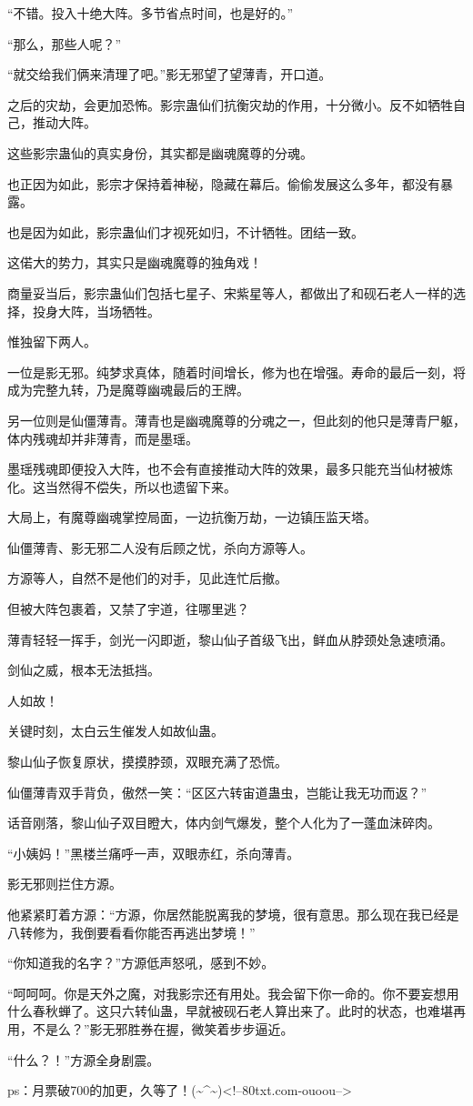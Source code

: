 \begin{this_body}
“不错。投入十绝大阵。多节省点时间，也是好的。”

“那么，那些人呢？”

“就交给我们俩来清理了吧。”影无邪望了望薄青，开口道。

之后的灾劫，会更加恐怖。影宗蛊仙们抗衡灾劫的作用，十分微小。反不如牺牲自己，推动大阵。

这些影宗蛊仙的真实身份，其实都是幽魂魔尊的分魂。

也正因为如此，影宗才保持着神秘，隐藏在幕后。偷偷发展这么多年，都没有暴露。

也是因为如此，影宗蛊仙们才视死如归，不计牺牲。团结一致。

这偌大的势力，其实只是幽魂魔尊的独角戏！

商量妥当后，影宗蛊仙们包括七星子、宋紫星等人，都做出了和砚石老人一样的选择，投身大阵，当场牺牲。

惟独留下两人。

一位是影无邪。纯梦求真体，随着时间增长，修为也在增强。寿命的最后一刻，将成为完整九转，乃是魔尊幽魂最后的王牌。

另一位则是仙僵薄青。薄青也是幽魂魔尊的分魂之一，但此刻的他只是薄青尸躯，体内残魂却并非薄青，而是墨瑶。

墨瑶残魂即便投入大阵，也不会有直接推动大阵的效果，最多只能充当仙材被炼化。这当然得不偿失，所以也遗留下来。

大局上，有魔尊幽魂掌控局面，一边抗衡万劫，一边镇压监天塔。

仙僵薄青、影无邪二人没有后顾之忧，杀向方源等人。

方源等人，自然不是他们的对手，见此连忙后撤。

但被大阵包裹着，又禁了宇道，往哪里逃？

薄青轻轻一挥手，剑光一闪即逝，黎山仙子首级飞出，鲜血从脖颈处急速喷涌。

剑仙之威，根本无法抵挡。

人如故！

关键时刻，太白云生催发人如故仙蛊。

黎山仙子恢复原状，摸摸脖颈，双眼充满了恐慌。

仙僵薄青双手背负，傲然一笑：“区区六转宙道蛊虫，岂能让我无功而返？”

话音刚落，黎山仙子双目瞪大，体内剑气爆发，整个人化为了一蓬血沫碎肉。

“小姨妈！”黑楼兰痛呼一声，双眼赤红，杀向薄青。

影无邪则拦住方源。

他紧紧盯着方源：“方源，你居然能脱离我的梦境，很有意思。那么现在我已经是八转修为，我倒要看看你能否再逃出梦境！”

“你知道我的名字？”方源低声怒吼，感到不妙。

“呵呵呵。你是天外之魔，对我影宗还有用处。我会留下你一命的。你不要妄想用什么春秋蝉了。这只六转仙蛊，早就被砚石老人算出来了。此时的状态，也难堪再用，不是么？”影无邪胜券在握，微笑着步步逼近。

“什么？！”方源全身剧震。

ps：月票破700的加更，久等了！(\~{}\^{}\~{})<!--80txt.com-ouoou-->

\end{this_body}

